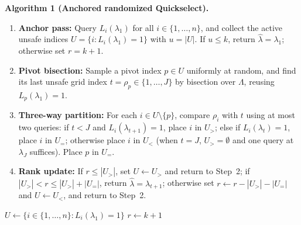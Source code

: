 \documentclass[a4paper,10pt]{article}
\theoremstyle{plain}
\theoremstyle{remark}
\begin{document}
\begin{samepage}
\textbf{Algorithm 1 (Anchored randomized Quickselect).}
\begin{enumerate}
\setlength{\itemsep}{2pt}\setlength{\topsep}{3pt}
\item \textbf{Anchor pass:} Query $L_i(\lambda_1)$ for all $i\in\{1,\ldots,n\}$, and collect the active unsafe indices $U=\{i:L_i(\lambda_1)=1\}$ with $u=|U|$. If $u\le k$, return $\widehat\lambda=\lambda_1$; otherwise set $r=k+1$.
\item \textbf{Pivot bisection:} Sample a pivot index $p\in U$ uniformly at random, and find its last unsafe grid index $t=\rho_p\in\{1,\ldots,J\}$ by bisection over $\Lambda$, reusing $L_p(\lambda_1)=1$.
\item \textbf{Three-way partition:} For each $i\in U\setminus\{p\}$, compare $\rho_i$ with $t$ using at most two queries: if $t<J$ and $L_i(\lambda_{t+1})=1$, place $i$ in $U_{>}$; else if $L_i(\lambda_t)=1$, place $i$ in $U_{=}$; otherwise place $i$ in $U_{<}$ (when $t=J$, $U_{>}=\emptyset$ and one query at $\lambda_J$ suffices). Place $p$ in $U_{=}$.
\item \textbf{Rank update:} If $r\le |U_{>}|$, set $U\leftarrow U_{>}$ and return to Step~2; if $|U_{>}|<r\le |U_{>}|+|U_{=}|$, return $\widehat\lambda=\lambda_{t+1}$; otherwise set $r\leftarrow r-|U_{>}|-|U_{=}|$ and $U\leftarrow U_{<}$, and return to Step~2.
\end{enumerate}
\end{samepage}

\begingroup
\SetAlFnt{\small}
\begin{algorithm}[H]
\caption{Anchored randomized Quickselect}\label{alg:anchor-code}
$U\gets\{i\in\{1,\ldots,n\}:L_i(\lambda_1)=1\}$\;
$r\gets k+1$\;
\end{algorithm}
\endgroup
\end{document}
